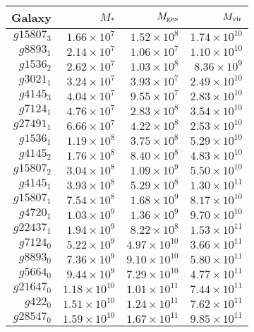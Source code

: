 \begin{tabular}{rrrr}
	\hline
    Galaxy & $M_*$ & $M_{\rm gas}$ & $M_{\rm vir}$ \\
	\hline
	\hline
    $g15807_3$ & $1.66\times10^7$    & $1.52\times10^8$    & $1.74\times10^{10}$ \\
    $g8893_1 $ & $2.14\times10^7$    & $1.06\times10^7$    & $1.10\times10^{10}$ \\
    $g1536_2 $ & $2.62\times10^7$    & $1.03\times10^8$    & $8.36\times10^{9}$ \\
    $g3021_1 $ & $3.24\times10^7$    & $3.93\times10^7$    & $2.49\times10^{10}$ \\
    $g4145_3 $ & $4.04\times10^7$    & $9.55\times10^7$    & $2.83\times10^{10}$ \\
    $g7124_1 $ & $4.76\times10^7$    & $2.83\times10^8$    & $3.54\times10^{10}$ \\
    $g27491_1$ & $6.66\times10^7$    & $4.22\times10^8$    & $2.53\times10^{10}$ \\
    $g1536_1 $ & $1.19\times10^8$    & $3.75\times10^8$    & $5.29\times10^{10}$ \\
    $g4145_2 $ & $1.76\times10^8$    & $8.40\times10^8$    & $4.83\times10^{10}$ \\
    $g15807_2$ & $3.04\times10^8$    & $1.09\times10^9$    & $5.50\times10^{10}$ \\
    $g4145_1 $ & $3.93\times10^8$    & $5.29\times10^8$    & $1.30\times10^{11}$ \\
    $g15807_1$ & $7.54\times10^8$    & $1.68\times10^9$    & $8.17\times10^{10}$ \\
    $g4720_1 $ & $1.03\times10^9$    & $1.36\times10^9$    & $9.70\times10^{10}$ \\
    $g22437_1$ & $1.94\times10^9$    & $8.22\times10^8$    & $1.53\times10^{11}$ \\
    $g7124_0 $ & $5.22\times10^9$    & $4.97\times10^{10}$ & $3.66\times10^{11}$ \\
	$g8893_0 $ & $7.36\times10^9$    & $9.10\times10^{10}$ & $5.80\times10^{11}$ \\
	$g5664_0 $ & $9.44\times10^9$    & $7.29\times10^{10}$ & $4.77\times10^{11}$ \\
	$g21647_0$ & $1.18\times10^{10}$ & $1.01\times10^{11}$ & $7.44\times10^{11}$ \\
	$g422_0  $ & $1.51\times10^{10}$ & $1.24\times10^{11}$ & $7.62\times10^{11}$ \\
	$g28547_0$ & $1.59\times10^{10}$ & $1.67\times10^{11}$ & $9.85\times10^{11}$ \\

\end{tabular}
